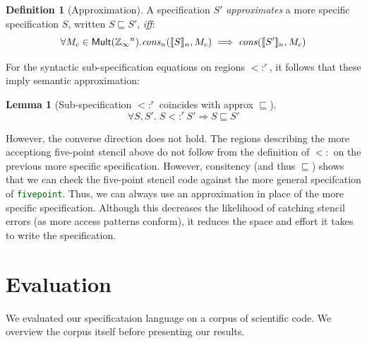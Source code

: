 \documentclass[9pt]{sigplanconf}
\newcounter{block}
\newtheorem{lemma}[block]{Lemma}
\theoremstyle{definition}
\newtheorem{definition}[block]{Definition}
\newcommand{\interp}[1]{\llbracket{#1}\rrbracket}
\newcommand{\term}[1]{\texttt{#1}}
\begin{document}
\begin{definition}[Approximation]
A specification $S'$
\emph{approximates} a more specific specification $S$, written 
$S \sqsubseteq S'$, \emph{iff}:
$$
\forall M_c \in \textsf{Mult}(\domainVal{}^n) . \mathit{cons}_n(\interp{S}_n,M_c) \implies
\mathit{cons}(\interp{S'}_n,M_c)
$$
\end{definition}
%
For the syntactic sub-specification equations on regions $<:^r$, it follows that
these imply semantic approximation:
%
\begin{lemma}[Sub-specification $<:^r$ coincides with approx 
$\sqsubseteq$]
\begin{equation*}
\forall S, S' . \; S <:^r S' \Rightarrow S \sqsubseteq S'
\end{equation*}
\end{lemma}
%
\noindent
However, the converse direction does not hold. 
The regions describing the more acceptiong five-point stencil
above do not follow from the definition of $<:$ on the previous
more specific specification.%
 However, consitency (and thus $\sqsubseteq$) shows
that we can check the five-point stencil code against the more general
specifcation of {\textcolor{darkgreen}{\term{fivepoint}}}. Thus, we
can always use an approximation in place of the
more specific specification. Although this decreases the likelihood of catching
stencil errors (as more access patterns conform), it reduces the space and
effort it takes to write the specification.

\section{Evaluation}
\label{sec:evaluation}
We evaluated our specificataion language on a corpus of scientific
code.  We overview the corpus itself before presenting our results.
\end{document}
